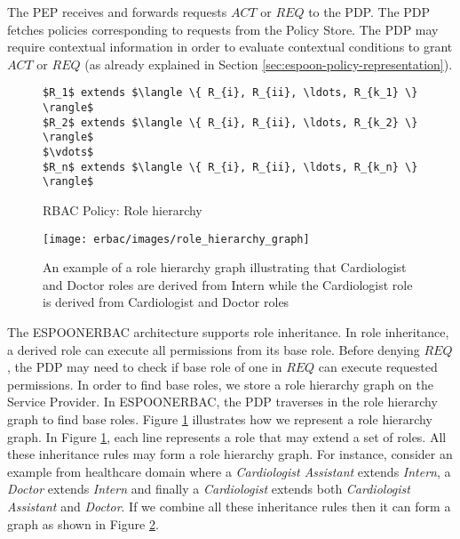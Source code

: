 \documentclass[epsfig,a4paper,11pt,titlepage]{book}
\numberwithin{algorithm}{chapter}
\newcommand{\Keywords}{\lstset{keywords={if,then,can,be,active,in,execute}}}
\begin{document}
The \gls{PEP} receives and forwards requests $\mathit{ACT}$ or $\mathit{REQ}$ to the \gls{PDP}. The \gls{PDP} fetches policies corresponding to requests from the Policy Store. The \gls{PDP} may require contextual information in order to evaluate contextual conditions to grant $\mathit{ACT}$ or $\mathit{REQ}$ (as already explained in Section \ref{sec:espoon-policy-representation}).

\begin{figure} [htp]
\Keywords
\begin{lstlisting}[style=AMMA,numbers=none,breaklines,mathescape,rulesepcolor=\color{black}]
$R_1$ extends $\langle \{ R_{i}, R_{ii}, \ldots, R_{k_1} \} \rangle$
$R_2$ extends $\langle \{ R_{i}, R_{ii}, \ldots, R_{k_2} \} \rangle$
$\vdots$
$R_n$ extends $\langle \{ R_{i}, R_{ii}, \ldots, R_{k_n} \} \rangle$

\end{lstlisting}
\caption[RBAC Policy: Role hierarchy]{\gls{RBAC} Policy: Role hierarchy}
\label{fig:erbac-policy-role-hierarchy}
\end{figure}

\begin{figure} [htp]
\centering
\texttt{[image: erbac/images/role\_hierarchy\_graph]}
\caption[An example of a role hierarchy graph]{An example of a role hierarchy graph illustrating that Cardiologist and Doctor roles are derived from Intern while the Cardiologist role is derived from Cardiologist and Doctor roles}
\label{fig:erbac-role_hierarchy_graph}
\end{figure}

The \gls{ESPOONERBAC} architecture supports role inheritance. In role inheritance, a derived role can execute all permissions from its base role. Before denying $\mathit{REQ}$, the \gls{PDP} may need to check if base role of one in $\mathit{REQ}$ can execute requested permissions. In order to find base roles, we store a role hierarchy graph on the Service Provider. In \gls{ESPOONERBAC}, the \gls{PDP} traverses in the role hierarchy graph to find base roles. Figure \ref{fig:erbac-policy-role-hierarchy} illustrates how we represent a role hierarchy graph. In Figure \ref{fig:erbac-policy-role-hierarchy}, each line represents a role that may extend a set of roles. All these inheritance rules may form a role hierarchy graph. For instance, consider an example from healthcare domain where a \emph{Cardiologist Assistant} extends \emph{Intern}, a \emph{Doctor} extends \emph{Intern} and finally a \emph{Cardiologist} extends both \emph{Cardiologist Assistant} and \emph{Doctor}. If we combine all these inheritance rules then it can form a graph as shown in Figure \ref{fig:erbac-role_hierarchy_graph}.
\end{document}
